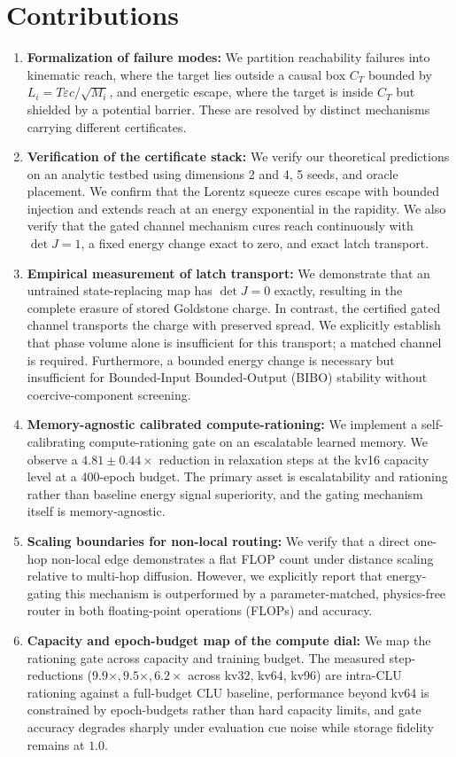 \documentclass{article}
\newcommand{\detJ}{\det J}
\begin{document}
\section{Contributions}
\label{app:contri}
\begin{enumerate}\itemsep2pt
\item \textbf{Formalization of failure modes:} We partition reachability failures into kinematic reach, where the target lies outside a causal box $C_T$ bounded by $L_i=T\varepsilon c/\sqrt{M_i}$, and energetic escape, where the target is inside $C_T$ but shielded by a potential barrier. These are resolved by distinct mechanisms carrying different certificates.
\item \textbf{Verification of the certificate stack:} We verify our theoretical predictions on an analytic testbed using dimensions 2 and 4, 5 seeds, and oracle placement. We confirm that the Lorentz squeeze cures escape with bounded injection and extends reach at an energy exponential in the rapidity. We also verify that the gated channel mechanism cures reach continuously with $\detJ=1$, a fixed energy change exact to zero, and exact latch transport.
\item \textbf{Empirical measurement of latch transport:} We demonstrate that an untrained state-replacing map has $\detJ=0$ exactly, resulting in the complete erasure of stored Goldstone charge. In contrast, the certified gated channel transports the charge with preserved spread. We explicitly establish that phase volume alone is insufficient for this transport; a matched channel is required. Furthermore, a bounded energy change is necessary but insufficient for Bounded-Input Bounded-Output (BIBO) stability without coercive-component screening.
\item \textbf{Memory-agnostic calibrated compute-rationing:} We implement a self-calibrating compute-rationing gate on an escalatable learned memory. We observe a $4.81\pm0.44\times$ reduction in relaxation steps at the kv16 capacity level at a 400-epoch budget. The primary asset is escalatability and rationing rather than baseline energy signal superiority, and the gating mechanism itself is memory-agnostic.
\item \textbf{Scaling boundaries for non-local routing:} We verify that a direct one-hop non-local edge demonstrates a flat FLOP count under distance scaling relative to multi-hop diffusion. However, we explicitly report that energy-gating this mechanism is outperformed by a parameter-matched, physics-free router in both floating-point operations (FLOPs) and accuracy.
\item \textbf{Capacity and epoch-budget map of the compute dial:} We map the rationing gate across capacity and training budget. The measured step-reductions ($9.9\times, 9.5\times, 6.2\times$ across kv32, kv64, kv96) are intra-CLU rationing against a full-budget CLU baseline, performance beyond kv64 is constrained by epoch-budgets rather than hard capacity limits, and gate accuracy degrades sharply under evaluation cue noise while storage fidelity remains at $1.0$.
\end{enumerate}
\end{document}
